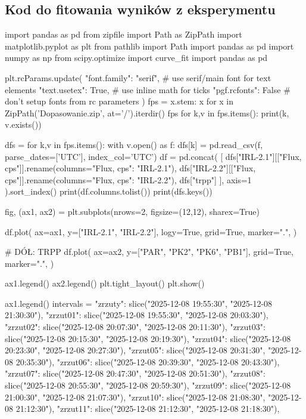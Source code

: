 \subsection{Kod do fitowania wyników z eksperymentu}
\begin{python}
import pandas as pd
from zipfile import Path as ZipPath
import matplotlib.pyplot as plt
from pathlib import Path
import pandas as pd
import numpy as np
from scipy.optimize import curve_fit
import pandas as pd



plt.rcParams.update({
	"font.family": "serif",  # use serif/main font for text elements
	"text.usetex": True,     # use inline math for ticks
	"pgf.rcfonts": False     # don't setup fonts from rc parameters
})
fps = {x.stem: x for x in ZipPath('Dopasowanie.zip', at='/').iterdir()}
fps     
for k,v in fps.items():
print(k, v.exists())

dfs = {}
for k,v in fps.items():
with v.open() as f:
dfs[k] = pd.read_csv(f, parse_dates=['UTC'], index_col='UTC')
df = pd.concat(
[
dfs["IRL-2.1"][["Flux, cps"]].rename(columns={"Flux, cps": "IRL-2.1"}),
dfs["IRL-2.2"][["Flux, cps"]].rename(columns={"Flux, cps": "IRL-2.2"}),
dfs["trpp"]
],
axis=1
).sort_index()
print(df.columns.tolist())
print(dfs.keys())

fig, (ax1, ax2) = plt.subplots(nrows=2, figsize=(12,12), sharex=True)


df.plot(
ax=ax1,
y=["IRL-2.1", "IRL-2.2"],
logy=True,
grid=True,
marker=".",
)

# DÓŁ: TRPP
df.plot(
ax=ax2,
y=["PAR", "PK2", "PK6", "PB1"],
grid=True,
marker=".",
)

ax1.legend()
ax2.legend()
plt.tight_layout()
plt.show()


ax1.legend()
intervals = {
	"zrzuty": slice("2025-12-08 19:55:30", "2025-12-08 21:30:30"),
	"zrzut01": slice("2025-12-08 19:55:30", "2025-12-08 20:03:30"),
	"zrzut02": slice("2025-12-08 20:07:30", "2025-12-08 20:11:30"),
	"zrzut03": slice("2025-12-08 20:15:30", "2025-12-08 20:19:30"),
	"zrzut04": slice("2025-12-08 20:23:30", "2025-12-08 20:27:30"),
	"zrzut05": slice("2025-12-08 20:31:30", "2025-12-08 20:35:30"),
	"zrzut06": slice("2025-12-08 20:39:30", "2025-12-08 20:43:30"),
	"zrzut07": slice("2025-12-08 20:47:30", "2025-12-08 20:51:30"),
	"zrzut08": slice("2025-12-08 20:55:30", "2025-12-08 20:59:30"),
	"zrzut09": slice("2025-12-08 21:00:30", "2025-12-08 21:07:30"),
	"zrzut10": slice("2025-12-08 21:08:30", "2025-12-08 21:12:30"),
	"zrzut11": slice("2025-12-08 21:12:30", "2025-12-08 21:18:30"),
}


\end{python}
